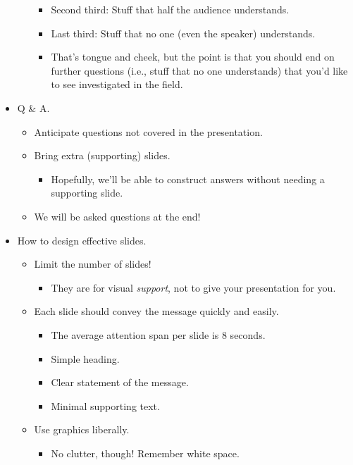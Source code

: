 \documentclass[../notes.tex]{subfiles}
\begin{document}
\begin{itemize}
\begin{itemize}
\begin{itemize}
            \item Second third: Stuff that half the audience understands.
            \item Last third: Stuff that no one (even the speaker) understands.
            \item That's tongue and cheek, but the point is that you should end on further questions (i.e., stuff that no one understands) that you'd like to see investigated in the field.
        \end{itemize}
    \end{itemize}
    \item Q \& A.
    \begin{itemize}
        \item Anticipate questions not covered in the presentation.
        \item Bring extra (supporting) slides.
        \begin{itemize}
            \item Hopefully, we'll be able to construct answers without needing a supporting slide.
        \end{itemize}
        \item We will be asked questions at the end!
    \end{itemize}
    \item How to design effective slides.
    \begin{itemize}
        \item Limit the number of slides!
        \begin{itemize}
            \item They are for visual \emph{support}, not to give your presentation for you.
        \end{itemize}
        \item Each slide should convey the message quickly and easily.
        \begin{itemize}
            \item The average attention span per slide is 8 seconds.
            \item Simple heading.
            \item Clear statement of the message.
            \item Minimal supporting text.
        \end{itemize}
        \item Use graphics liberally.
        \begin{itemize}
            \item No clutter, though! Remember white space.

\end{itemize}
\end{itemize}
\end{itemize}
\end{document}
